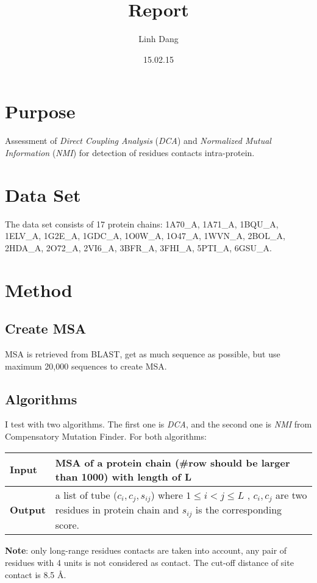 \documentclass[a4paper,12pt]{article}
\begin{document}
\title{Report}
\author{Linh Dang}
\date{15.02.15} 
\maketitle

\section*{Purpose}
Assessment of \emph{Direct Coupling Analysis} (\emph{DCA}) and \emph{Normalized Mutual Information} (\emph{NMI}) for detection of residues contacts intra-protein.

\section*{Data Set}
The data set consists of 17 protein chains: 1A70\_A, 1A71\_A, 1BQU\_A, 1ELV\_A, 1G2E\_A, 1GDC\_A, 1O0W\_A, 1O47\_A, 1WVN\_A, 2BOL\_A, 2HDA\_A, 2O72\_A, 2VI6\_A, 3BFR\_A, 3FHI\_A, 5PTI\_A, 6GSU\_A.

\section*{Method}
\subsection{Create MSA}
MSA is retrieved from BLAST, get as much sequence as possible, but use maximum 20,000 sequences to create MSA.
\subsection{Algorithms}
I test with two algorithms. The first one is \emph{DCA}, and the second one is \emph{NMI} from Compensatory Mutation Finder. For both algorithms:
\[\]

\begin{tabular}{ |p{3cm}|p{10cm}| } 
 \hline
 \textbf{Input} & MSA of a protein chain (\#row should be larger than 1000) with length of L   \\ 
 \hline
 \textbf{Output} & a list of tube (\(c_i, c_j, s_{ij} \)) where \( 1 \leq i<j \leq L \) , $ c_i, c_j$ are two residues in protein chain and $s_{ij}$ is the corresponding score.   \\ 
 
 \hline
\end{tabular}

\textbf{Note}: only long-range residues contacts are taken into account, any pair of residues with 4 units is not considered as contact. The cut-off distance of site contact is 8.5 {\AA}.
\end{document}
